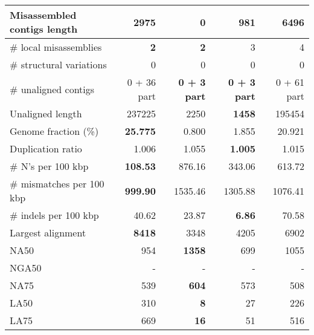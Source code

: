 \documentclass[12pt,a4paper]{article}
\begin{document}
\begin{table}[ht]
\begin{center}
\begin{tabular}{|l*{4}{|r}|}
Misassembled contigs length & 2975 & {\bf 0} & 981 & 6496 \\ \hline
\# local misassemblies & {\bf 2} & {\bf 2} & 3 & 4 \\ \hline
\# structural variations & 0 & 0 & 0 & 0 \\ \hline
\# unaligned contigs & 0 + 36 part & {\bf 0 + 3 part} & {\bf 0 + 3 part} & 0 + 61 part \\ \hline
Unaligned length & 237225 & 2250 & {\bf 1458} & 195454 \\ \hline
Genome fraction (\%) & {\bf 25.775} & 0.800 & 1.855 & 20.921 \\ \hline
Duplication ratio & 1.006 & 1.055 & {\bf 1.005} & 1.015 \\ \hline
\# N's per 100 kbp & {\bf 108.53} & 876.16 & 343.06 & 613.72 \\ \hline
\# mismatches per 100 kbp & {\bf 999.90} & 1535.46 & 1305.88 & 1076.41 \\ \hline
\# indels per 100 kbp & 40.62 & 23.87 & {\bf 6.86} & 70.58 \\ \hline
Largest alignment & {\bf 8418} & 3348 & 4205 & 6902 \\ \hline
NA50 & 954 & {\bf 1358} & 699 & 1055 \\ \hline
NGA50 & - & - & - & - \\ \hline
NA75 & 539 & {\bf 604} & 573 & 508 \\ \hline
LA50 & 310 & {\bf 8} & 27 & 226 \\ \hline
LA75 & 669 & {\bf 16} & 51 & 516 \\ \hline
\end{tabular}
\end{center}
\end{table}
\end{document}

